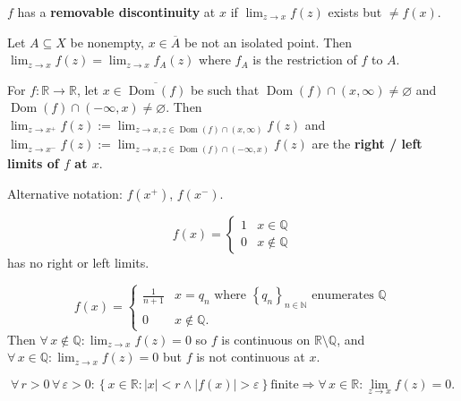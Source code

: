 \documentclass{notes}
\begin{document}
\newpage

\begin{defn}
  $f$ has a {\boldmath \bfseries removable discontinuity} at $x$ if $\lim_{z \to x} f(z)$ exists but $\neq f(x)$.
\end{defn}

\begin{defn}
  Let $A \subseteq X$ be nonempty, $x \in \overline A$ be not an isolated point.
  Then $\lim_{z \to x} f(z) = \lim_{z \to x} f_A(z)$ where $f_A$ is the restriction of $f$ to $A$.
\end{defn}

\begin{defn}
  For $f \colon \mathbb R \to \mathbb R$, let $x \in \overline{\operatorname{Dom}(f)}$ be such that $\operatorname{Dom}(f) \cap (x, \infty) \neq \varnothing$ and $\operatorname{Dom}(f) \cap (-\infty, x) \neq \varnothing$.
  Then $\lim_{z \to x^+} f(z) := \lim_{z \to x, z \in \operatorname{Dom}(f) \cap (x, \infty)} f(z)$ and $\lim_{z \to x^-} f(z) := \lim_{z \to x, z \in \operatorname{Dom}(f) \cap (-\infty, x)} f(z)$ are the {\boldmath \bfseries right / left limits of $f$ at $x$}.

  Alternative notation: $f(x^+)$, $f(x^-)$.
\end{defn}

\begin{eg}
  \[
    f(x) = \begin{cases}
      1 & x \in \mathbb Q \\ 
      0 & x \not \in \mathbb Q
    \end{cases}
  \]
  has no right or left limits.
\end{eg}

\begin{eg}
  \[
    f(x) = \begin{cases}
      \frac{1}{n + 1} & x = q_n \text{ where $\left \{ q_n \right \}_{n \in \mathbb N}$ enumerates $\mathbb Q$} \\ 
      0 & x \not \in \mathbb Q.
    \end{cases}
  \]
  Then $\forall \, x \not \in \mathbb Q: \lim_{z \to x} f(z) = 0$ so $f$ is continuous on $\mathbb R \setminus \mathbb Q$, and $\forall \, x \in \mathbb Q: \lim_{z \to x} f(z) = 0$ but $f$ is not continuous at $x$.
\end{eg}

\begin{lem}
  \[
    \forall \, r > 0 \, \forall \, \varepsilon > 0: \left \{ x \in \mathbb R : \left | x \right | < r \land \left | f(x) \right | > \varepsilon \right \} \text{finite} \Rightarrow \forall \, x \in \mathbb R: \lim_{z \to x} f(z) = 0.
  \]
\end{lem}
\end{document}
